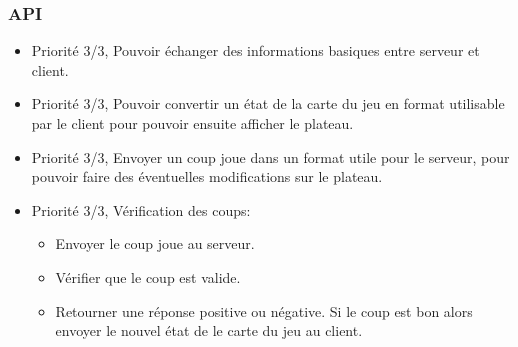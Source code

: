 \documentclass{article}[a4paper, 12pt]
\begin{document}
\subsubsection{API}
\begin{itemize}
    \item Priorité 3/3, Pouvoir échanger des informations basiques entre serveur et client.
    \item Priorité 3/3, Pouvoir convertir un état de la carte du jeu en format utilisable par le client pour pouvoir ensuite afficher le plateau.
    \item Priorité 3/3, Envoyer un coup joue dans un format utile pour le serveur, pour pouvoir faire des éventuelles modifications sur le plateau.
    \item Priorité 3/3, Vérification des coups:
    \begin{itemize}
        \item Envoyer le coup joue au serveur.
        \item Vérifier que le coup est valide.
        \item Retourner une réponse positive ou négative. Si le coup est bon alors envoyer le nouvel état de le carte du jeu au client.
    \end{itemize}
    
\end{itemize}
\end{document}

